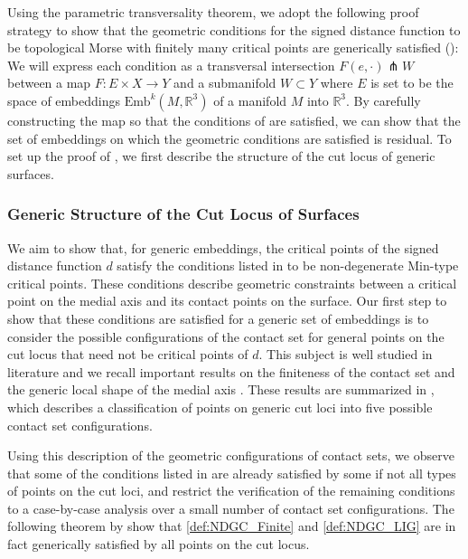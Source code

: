 \documentclass[11pt]{article}
\newcommand{\R}{\mathbb{R}}
\newcommand{\Emb}{\mathrm{Emb}^k(M,\R^3)}
\theoremstyle{plain}
\theoremstyle{definition}
\theoremstyle{remark}
\begin{document}
Using the parametric transversality theorem, we adopt the following proof strategy to show that the geometric conditions for the signed distance function to be topological Morse with finitely many critical points are generically satisfied (): We will express each condition as a transversal intersection $F(e, \cdot) \pitchfork W$ between a map $F: E \times X \to Y$ and a submanifold $W \subset Y$ where $E$ is set to be the space of embeddings $\Emb$ of a manifold $M$ into $\R^3$. By carefully constructing the map so that the conditions of  are satisfied, we can show that the set of embeddings on which the geometric conditions are satisfied is residual. To set up the proof of , we first describe the structure of the cut locus of generic surfaces. 

\subsubsection{Generic Structure of the Cut Locus of Surfaces}

We aim to show that, for generic embeddings, the critical points of the signed distance function $d$ satisfy the conditions listed in  to be non-degenerate Min-type critical points. These conditions describe geometric constraints between a critical point on the medial axis and its contact points on the surface. Our first step to show that these conditions are satisfied for a generic set of embeddings is to consider the possible configurations of the contact set for general points on the cut locus that need not be critical points of $d$. This subject is well studied in literature and we recall important results on the finiteness of the contact set and the generic local shape of the medial axis \citep{yomdin_local_1981, mather_distance_1983, giblin_symmetry_2000, cazals_differential_2005, damon_global_2006}. These results are summarized in , which describes a classification of points on generic cut loci into five possible contact set configurations. 

Using this description of the geometric configurations of contact sets, we observe that some of the conditions listed in  are already satisfied by some if not all types of points on the cut loci, and restrict the verification of the remaining conditions to a case-by-case analysis over a small number of contact set configurations. The following theorem by \cite{yomdin_local_1981} show that \ref{def:NDGC_Finite} and \ref{def:NDGC_LIG} are in fact generically satisfied by all points on the cut locus. 
\end{document}
